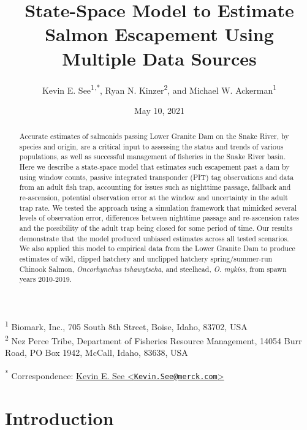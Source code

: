 \documentclass[
  12pt,
]{article}
\title{State-Space Model to Estimate Salmon Escapement Using Multiple Data Sources}
\author{Kevin E. See\textsuperscript{1,*}, Ryan N. Kinzer\textsuperscript{2}, and Michael W. Ackerman\textsuperscript{1}}
\date{May 10, 2021}
\begin{document}
\maketitle
\begin{abstract}
Accurate estimates of salmonids passing Lower Granite Dam on the Snake River, by species and origin, are a critical input to assessing the status and trends of various populations, as well as successful management of fisheries in the Snake River basin. Here we describe a state-space model that estimates such escapement past a dam by using window counts, passive integrated transponder (PIT) tag observations and data from an adult fish trap, accounting for issues such as nighttime passage, fallback and re-ascension, potential observation error at the window and uncertainty in the adult trap rate. We tested the approach using a simulation framework that mimicked several levels of observation error, differences between nighttime passage and re-ascension rates and the possibility of the adult trap being closed for some period of time. Our results demonstrate that the model produced unbiased estimates across all tested scenarios. We also applied this model to empirical data from the Lower Granite Dam to produce estimates of wild, clipped hatchery and unclipped hatchery spring/summer-run Chinook Salmon, \emph{Oncorhynchus tshawytscha}, and steelhead, \emph{O. mykiss}, from spawn years 2010-2019.
\end{abstract}

\textsuperscript{1} Biomark, Inc., 705 South 8th Street, Boise, Idaho, 83702, USA\\
\textsuperscript{2} Nez Perce Tribe, Department of Fisheries Resource Management, 14054 Burr Road, PO Box 1942, McCall, Idaho, 83638, USA

\textsuperscript{*} Correspondence: \href{mailto:Kevin.See@merck.com}{Kevin E. See \textless{}\href{mailto:Kevin.See@merck.com}{\nolinkurl{Kevin.See@merck.com}}\textgreater{}}

\hypertarget{introduction}{%
\section{Introduction}\label{introduction}}
\end{document}

